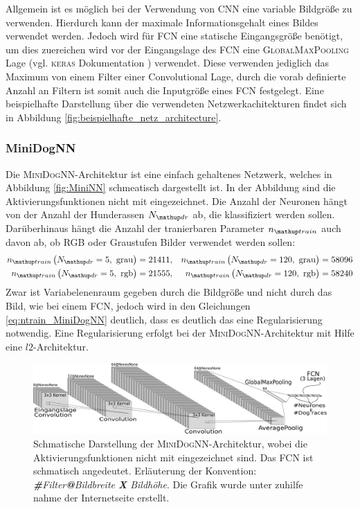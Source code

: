 Allgemein ist es möglich bei der Verwendung von CNN eine variable Bildgröße
zu verwenden. Hierdurch kann der maximale Informationsgehalt eines Bildes
verwendet werden. Jedoch wird für FCN eine statische Eingangsgröße benötigt,
um dies zuereichen wird vor der Eingangslage des FCN eine \textsc{GlobalMaxPooling}
Lage (vgl. \textsc{keras} Dokumentation \cite{keras_max_pooling}) verwendet.
Diese verwenden jediglich das Maximum von einem Filter einer Convolutional Lage,
durch die vorab definierte Anzahl an Filtern ist somit auch die Inputgröße eines
FCN festgelegt.
Eine beispielhafte Darstellung über die verwendeten Netzwerkachitekturen findet sich
in Abbildung \ref{fig:beispielhafte_netz_architecture}.

 \subsubsection{MiniDogNN}
 Die \textsc{MiniDogNN}-Architektur ist eine einfach gehaltenes Netzwerk, welches
 in Abbildung \ref{fig:MiniNN} schmeatisch dargestellt ist. In der Abbildung sind
 die Aktivierungsfunktionen nicht mit eingezeichnet. Die Anzahl der Neuronen
 hängt von der Anzahl der Hunderassen $N\ua{dr}$ ab, die klassifiziert werden sollen.
 Darüberhinaus hängt die Anzahl der tranierbaren Parameter $n\ua{train}$ auch davon ab, ob \textsc{RGB} oder
 Graustufen Bilder verwendet werden sollen:
 \begin{align}
   \begin{aligned}
     \label{eq: ntrain_MiniDogNN}
   n\ua{train}\left(N\ua{dr}=5, \,\, \mathrm{grau}\right) &= 21411, & n\ua{train}\left(N\ua{dr}=120, \,\, \mathrm{grau}\right) & = 58096 \\
   n\ua{train}\left(N\ua{dr}=5, \,\, \mathrm{rgb}\right) &= 21555, & n\ua{train}\left(N\ua{dr}=120, \,\, \mathrm{rgb}\right) & = 58240
   \end{aligned}
 \end{align}
 Zwar ist Variabelenenraum gegeben durch die Bildgröße und nicht durch das Bild, wie
 bei einem FCN, jedoch wird in den Gleichungen \eqref{eq:ntrain_MiniDogNN} deutlich,
 dass es deutlich das eine Regularisierung notwendig. Eine Regularisierung
 erfolgt bei der \textsc{MiniDogNN}-Architektur mit Hilfe eine $l2$-Architektur.
 \begin{figure}
 \centering
 \includegraphics[width=\the\textwidth]{../../final_data/general/MiniDogNN.pdf}
 \caption{Schmatische Darstellung der \textsc{MiniDogNN}-Architektur, wobei
          die Aktivierungsfunktionen nicht mit eingezeichnet sind. Das FCN
          ist schmatisch angedeutet. Erläuterung der Konvention: \emph{\textbf{\#}Filter\textbf{@}Bildbreite \textbf{X} Bildhöhe}.
          Die Grafik wurde unter zuhilfe nahme der Internetseite \cite{net_svg_source} erstellt.}
 \label{fig:MiniDogNN}
 \end{figure}

